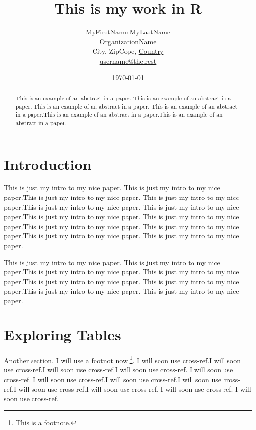 \documentclass[a4paper, 12pt]{article}
\title{This is my work in R}
\author{ MyFirstName MyLastName\\OrganizationName\\
         City, ZipCope, \underline{Country}\\
        \url{username@the.rest}}
\date{\today}  %
\begin{document}

\maketitle 
\begin{abstract}
This is an example of an abstract in a paper. This is an example of an abstract in a paper. This is an example of an abstract in a paper. This is an example of an abstract in a paper.This is an example of an abstract in a paper.This is an example of an abstract in a paper.
\end{abstract}



\section*{Introduction} %

This is just my intro to my nice paper. This is just my intro to my nice paper.This is just my intro to my nice paper. This is just my intro to my nice paper.This is just my intro to my nice paper. This is just my intro to my nice paper.This is just my intro to my nice paper. This is just my intro to my nice paper.This is just my intro to my nice paper. This is just my intro to my nice paper.This is just my intro to my nice paper. This is just my intro to my nice paper.

This is just my intro to my nice paper. This is just my intro to my nice paper.This is just my intro to my nice paper. This is just my intro to my nice paper.This is just my intro to my nice paper. This is just my intro to my nice paper.This is just my intro to my nice paper. This is just my intro to my nice paper.


\section{Exploring Tables}\label{explo-tables} %

Another section. I will use a footnot now \footnote{This is a footnote.}. I will soon use cross-ref.I will soon use cross-ref.I will soon use cross-ref.I will soon use cross-ref. I will soon use cross-ref. I will soon use cross-ref.I will soon use cross-ref.I will soon use cross-ref.I will soon use cross-ref.I will soon use cross-ref. I will soon use cross-ref. I will soon use cross-ref.
\end{document}
